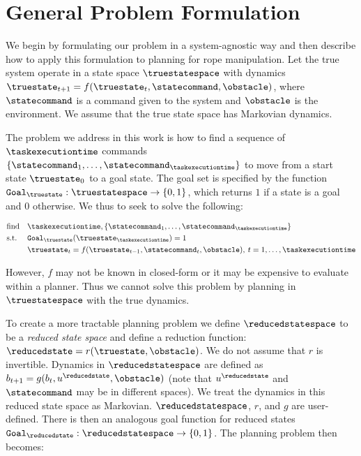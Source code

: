 

\section{General Problem Formulation}


We begin by formulating our problem in a system-agnostic way and then describe how to apply this formulation to planning for rope manipulation. Let the true system operate in a state space $\truestatespace$ with dynamics $\truestate_{t+1} = f(\truestate_t,\statecommand,\obstacle)$, where $\statecommand$ is a command given to the system and $\obstacle$ is the environment. We assume that the true state space has Markovian dynamics. 

The problem we address in this work is how to find a sequence of $\taskexecutiontime$ commands $\{\statecommand_1, \dots, \statecommand_{\taskexecutiontime} \}$ to move from a start state $\truestate_0$ to a goal state. The goal set is specified by the function $\texttt{Goal}_\truestate: \truestatespace \rightarrow \{ 0,1 \}$, which returns $1$ if a state is a goal and $0$ otherwise. We thus to seek to solve the following:


\begin{equation}
    \begin{aligned}
        & \text{find}   & & \taskexecutiontime, \{\statecommand_1, \dots, \statecommand_{\taskexecutiontime} \} \\
        & \text{s.t.}   & & \texttt{Goal}_\truestate(\truestate_{\taskexecutiontime}) = 1\\ 
        &               & & \truestate_t = f(\truestate_{t-1}, \statecommand_t,\obstacle), \:  t = 1, \dots, \taskexecutiontime\\
    \end{aligned}
    \label{eqn:main_planning_problem}
\end{equation}

\noindent However, $f$ may not be known in closed-form or it may be expensive to evaluate within a planner. Thus we cannot solve this problem by planning in $\truestatespace$ with the true dynamics.


To create a more tractable planning problem we define $\reducedstatespace$ to be a \textit{reduced state space} and define a reduction function: $\reducedstate = r(\truestate,\obstacle)$. We do not assume that $r$ is invertible. Dynamics in $\reducedstatespace$ are defined as $b_{t+1} = g(b_t,u^\reducedstate,\obstacle)$ (note that $u^\reducedstate$ and $\statecommand$ may be in different spaces). We treat the dynamics in this reduced state space as Markovian. %
$\reducedstatespace$, $r$, and $g$ are user-defined. There is then an analogous goal function for reduced states $\texttt{Goal}_\reducedstate: \reducedstatespace \rightarrow \{ 0,1 \}$.  The planning problem then becomes:


